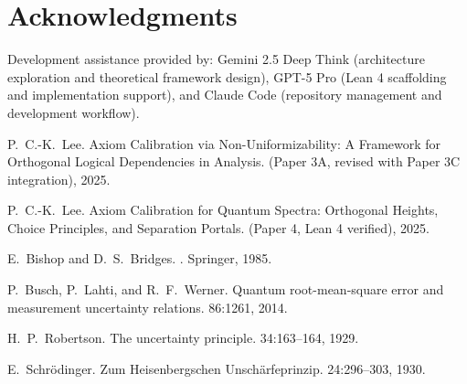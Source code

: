 \documentclass[11pt]{article}
\theoremstyle{plain}
\theoremstyle{definition}
\theoremstyle{remark}
\begin{document}
\bigskip

\section*{Acknowledgments}
Development assistance provided by: Gemini 2.5 Deep Think (architecture exploration and theoretical framework design), GPT-5 Pro (Lean 4 scaffolding and implementation support), and Claude Code (repository management and development workflow).


\begin{thebibliography}{99}

P.~C.-K.~Lee.
\newblock Axiom Calibration via Non-Uniformizability: A Framework for Orthogonal Logical Dependencies in Analysis.
\newblock (Paper 3A, revised with Paper 3C integration), 2025.

P.~C.-K.~Lee.
\newblock Axiom Calibration for Quantum Spectra: Orthogonal Heights, Choice Principles, and Separation Portals.
\newblock (Paper 4, Lean 4 verified), 2025.

E.~Bishop and D.~S.~Bridges.
.
\newblock Springer, 1985.

P.~Busch, P.~Lahti, and R.~F.~Werner.
\newblock Quantum root-mean-square error and measurement uncertainty relations.
 86:1261, 2014.

H.~P.~Robertson.
\newblock The uncertainty principle.
 34:163--164, 1929.

E.~Schrödinger.
\newblock Zum Heisenbergschen Unschärfeprinzip.
 24:296--303, 1930.

\end{thebibliography}
\end{document}
